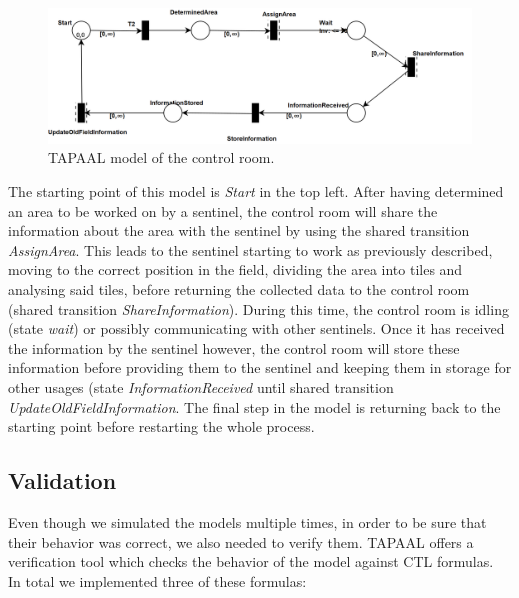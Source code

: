 \documentclass[english]{lni}
\begin{document}
\begin{figure}[H]
    \centering
    \includegraphics[width = 12cm]{img/controlRoom.png}
    \caption{TAPAAL model of the control room.}
    \label{fig:ControlRoom}
\end{figure}
The starting point of this model is \textit{Start} in the top left. After having determined an area to be worked on by a sentinel, the control room will share the information about the area with the sentinel by using the shared transition \textit{AssignArea}. This leads to the sentinel starting to work as previously described, moving to the correct position in the field, dividing the area into tiles and analysing said tiles, before returning the collected data to the control room (shared transition \textit{ShareInformation}). During this time, the control room is idling (state \textit{wait}) or possibly communicating with other sentinels. Once it has received the information by the sentinel however, the control room will store these information before providing them to the sentinel and keeping them in storage for other usages (state \textit{InformationReceived} until shared transition \textit{UpdateOldFieldInformation}. The final step in the model is returning back to the starting point before restarting the whole process.

\subsection{Validation}
Even though we simulated the models multiple times, in order to be sure that their behavior was correct, we also needed to verify them. TAPAAL offers a verification tool which checks the behavior of the model against CTL formulas. \cite{DJJJMS:TACAS:12} \\
In total we implemented three of these formulas:\\
\end{document}
